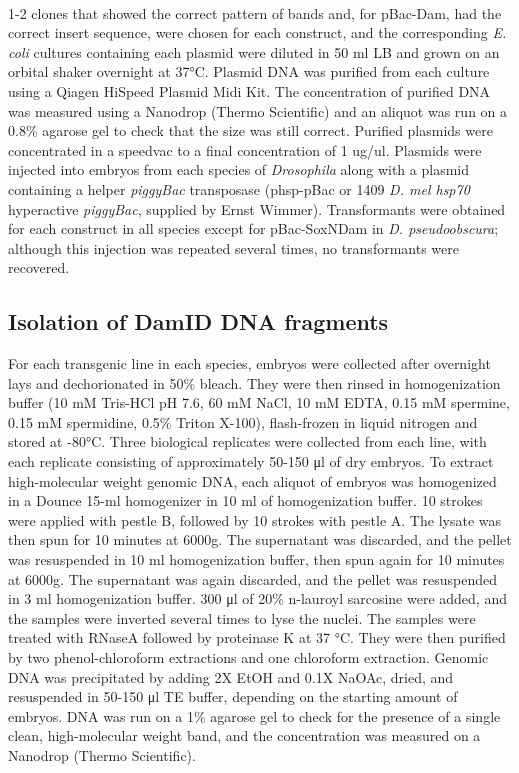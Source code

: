 \paragraph{}
1-2 clones that showed the correct pattern of bands and, for pBac-Dam, had the correct insert sequence, were chosen for each construct, and the corresponding \emph{E. coli} cultures containing each plasmid were diluted in 50 ml LB and grown on an orbital shaker overnight at 37°C. Plasmid DNA was purified from each culture using a Qiagen HiSpeed Plasmid Midi Kit. The concentration of purified DNA was measured using a Nanodrop (Thermo Scientific) and an aliquot was run on a 0.8\% agarose gel to check that the size was still correct. Purified plasmids were concentrated in a speedvac to a final concentration of 1 ug/ul. Plasmids were injected into embryos from each species of \emph{Drosophila} along with a plasmid containing a helper \emph{piggyBac} transposase (phsp-pBac or 1409 \emph{D. mel hsp70} hyperactive \emph{piggyBac}, supplied by Ernst Wimmer). Transformants were obtained for each construct in all species except for pBac-SoxNDam in \emph{D. pseudoobscura}; although this injection was repeated several times, no transformants were recovered.

\subsection{Isolation of DamID DNA fragments}
For each transgenic line in each species, embryos were collected after overnight lays and dechorionated in 50\% bleach. They were then rinsed in homogenization buffer (10 mM Tris-HCl pH 7.6, 60 mM NaCl, 10 mM EDTA, 0.15 mM spermine, 0.15 mM spermidine, 0.5\% Triton X-100), flash-frozen in liquid nitrogen and stored at -80°C. Three biological replicates were collected from each line, with each replicate consisting of approximately 50-150 μl of dry embryos. To extract high-molecular weight genomic DNA, each aliquot of embryos was homogenized in a Dounce 15-ml homogenizer in 10 ml of homogenization buffer. 10 strokes were applied with pestle B, followed by 10 strokes with pestle A. The lysate was then spun for 10 minutes at 6000g. The supernatant was discarded, and the pellet was resuspended in 10 ml homogenization buffer, then spun again for 10 minutes at 6000g. The supernatant was again discarded, and the pellet was resuspended in 3 ml homogenization buffer. 300 μl of 20\% n-lauroyl sarcosine were added, and the samples were inverted several times to lyse the nuclei. The samples were treated with RNaseA followed by proteinase K at 37 °C. They were then purified by two phenol-chloroform extractions and one chloroform extraction. Genomic DNA was precipitated by adding 2X EtOH and 0.1X NaOAc, dried, and resuspended in 50-150 μl TE buffer, depending on the starting amount of embryos. DNA was run on a 1\% agarose gel to check for the presence of a single clean, high-molecular weight band, and the concentration was measured on a Nanodrop (Thermo Scientific).
